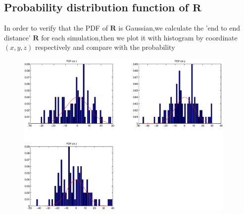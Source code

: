 \documentclass{article}
\begin{document}
\subsection{Probability distribution function of $\bm{R}$  }
In order to verify that the PDF of $\bm{R}$ is Gaussian,we calculate the 'end to end distance' $\bm{R}$ for each simulation,then we plot it with histogram by coordinate $(x,y,z)$ respectively and compare with the probability
\begin{figure}[H]
	\includegraphics[width=4.2in]{PDF.eps} 
	 
	 \end{figure}
\end{document}
